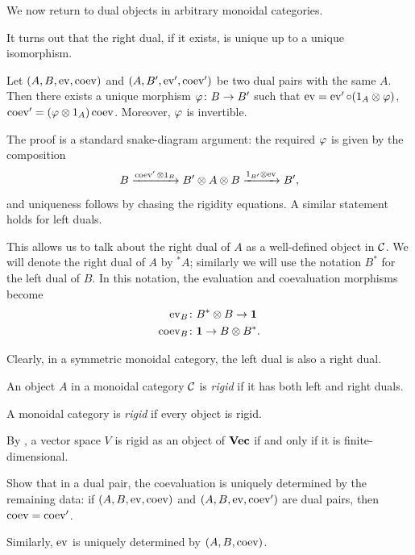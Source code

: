 We now return to dual objects in arbitrary monoidal categories.

It turns out that the right dual, if it exists, is unique up to a unique
isomorphism.
\begin{theorem}\label{t:dual_unique1}
  Let $(A, B, \operatorname{ev}, \operatorname{coev})$ and $(A,B', \operatorname{ev}', \operatorname{coev}')$ be two dual pairs with
  the same $A$. Then there exists a unique morphism $\varphi\colon B\to B'$ such
  that $\operatorname{ev} = \operatorname{ev}' \circ (1_A\otimes \varphi)$, $\operatorname{coev}' =(\varphi\otimes 1_A) \operatorname{coev}$.
  Moreover, $\varphi$ is invertible. 
\end{theorem}
The proof is a standard snake-diagram argument: the required $\varphi$ is given by
the composition
$$
  B \xrightarrow{\operatorname{coev}'\otimes 1_B} B'\otimes A\otimes B
    \xrightarrow{1_{B'}\otimes \operatorname{ev}} B',
$$
and uniqueness follows by chasing the rigidity equations.
A similar statement holds for left duals.

This allows us to talk about the right dual of $A$ as a well-defined object in
$\mathcal{C}$. We will denote the right dual of $A$ by ${}^*A$; similarly we will use
the notation $B^*$ for the left dual of $B$. In this notation, the evaluation
and coevaluation morphisms become
\begin{equation}
  \begin{aligned}
    \operatorname{ev}_B&\colon B^*\otimes B\to\mathbf{1}\\
    \operatorname{coev}_B&\colon \mathbf{1} \to B\otimes B^*.
  \end{aligned}
\end{equation}

Clearly, in a symmetric monoidal
category, the left dual is also a right dual.

\begin{definition}\label{d:rigid}
  An object $A$ in a monoidal category $\mathcal{C}$ is
  \emph{rigid} if
  it has both left and right duals.

  A monoidal category is \emph{rigid}
  if every object is rigid.
\end{definition}

\begin{example}\label{x:vector-rigid}
  By , a vector space $V$ is rigid as an object of
  $\mathbf{Vec}$ if and only if it is finite-dimensional.
\end{example}


\begin{exercise}\label{ec:coev-unique}
  Show that in a dual pair, the coevaluation is uniquely determined by
  the remaining data: if $(A, B, \operatorname{ev}, \operatorname{coev})$ and $(A,B, \operatorname{ev}, \operatorname{coev}')$
  are dual pairs, then $\operatorname{coev} = \operatorname{coev}'$.

  Similarly, $\operatorname{ev}$ is uniquely determined by $(A,B, \operatorname{coev})$.
\end{exercise}

